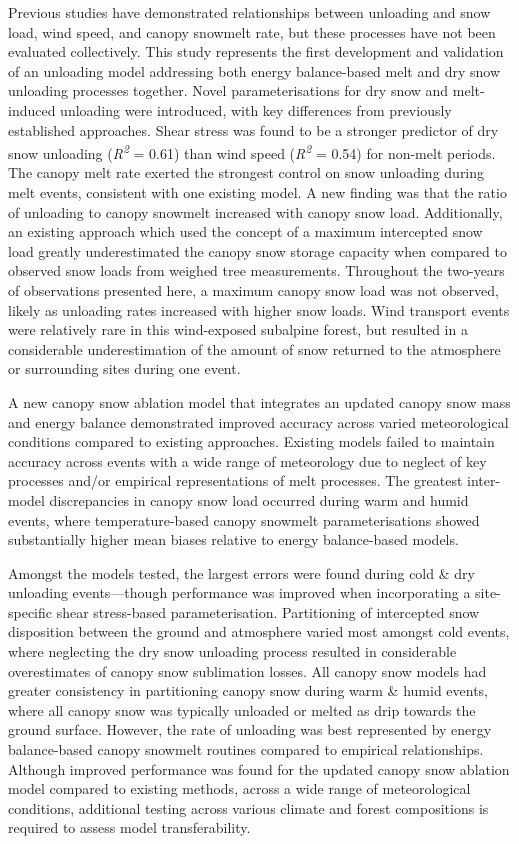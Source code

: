 \documentclass[
  letterpaper,
]{tex/uofsthesis-cs}
\begin{document}
Previous studies have demonstrated relationships between unloading and
snow load, wind speed, and canopy snowmelt rate, but these processes
have not been evaluated collectively. This study represents the first
development and validation of an unloading model addressing both energy
balance-based melt and dry snow unloading processes together. Novel
parameterisations for dry snow and melt-induced unloading were
introduced, with key differences from previously established approaches.
Shear stress was found to be a stronger predictor of dry snow unloading
(\emph{R\textsuperscript{2}} = 0.61) than wind speed
(\emph{R\textsuperscript{2}} = 0.54) for non-melt periods. The canopy
melt rate exerted the strongest control on snow unloading during melt
events, consistent with one existing model. A new finding was that the
ratio of unloading to canopy snowmelt increased with canopy snow load.
Additionally, an existing approach which used the concept of a maximum
intercepted snow load greatly underestimated the canopy snow storage
capacity when compared to observed snow loads from weighed tree
measurements. Throughout the two-years of observations presented here, a
maximum canopy snow load was not observed, likely as unloading rates
increased with higher snow loads. Wind transport events were relatively
rare in this wind-exposed subalpine forest, but resulted in a
considerable underestimation of the amount of snow returned to the
atmosphere or surrounding sites during one event.

A new canopy snow ablation model that integrates an updated canopy snow
mass and energy balance demonstrated improved accuracy across varied
meteorological conditions compared to existing approaches. Existing
models failed to maintain accuracy across events with a wide range of
meteorology due to neglect of key processes and/or empirical
representations of melt processes. The greatest inter-model
discrepancies in canopy snow load occurred during warm and humid events,
where temperature-based canopy snowmelt parameterisations showed
substantially higher mean biases relative to energy balance-based
models.

Amongst the models tested, the largest errors were found during cold \&
dry unloading events---though performance was improved when
incorporating a site-specific shear stress-based parameterisation.
Partitioning of intercepted snow disposition between the ground and
atmosphere varied most amongst cold events, where neglecting the dry
snow unloading process resulted in considerable overestimates of canopy
snow sublimation losses. All canopy snow models had greater consistency
in partitioning canopy snow during warm \& humid events, where all
canopy snow was typically unloaded or melted as drip towards the ground
surface. However, the rate of unloading was best represented by energy
balance-based canopy snowmelt routines compared to empirical
relationships. Although improved performance was found for the updated
canopy snow ablation model compared to existing methods, across a wide
range of meteorological conditions, additional testing across various
climate and forest compositions is required to assess model
transferability.
\end{document}
